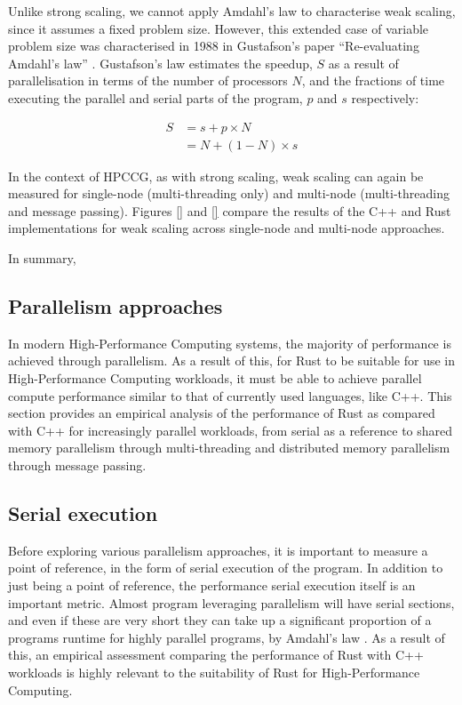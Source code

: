 Unlike strong scaling, we cannot apply Amdahl's law to characterise weak scaling, since it assumes a fixed problem size. However, this extended case of variable problem size was characterised in 1988 in Gustafson's paper ``Re-evaluating Amdahl's law'' \cite{gustafsonReevaluatingAmdahlLaw1988}. Gustafson's law estimates the speedup, $S$ as a result of parallelisation in terms of the number of processors $N$, and the fractions of time executing the parallel and serial parts of the program, $p$ and $s$ respectively:

\begin{align}
    S &= s + p \times N \\
      &= N + (1 - N) \times s
\end{align}

In the context of HPCCG, as with strong scaling, weak scaling can again be measured for single-node (multi-threading only) and multi-node (multi-threading and message passing). Figures \ref{} and \ref{} compare the results of the C++ and Rust implementations for weak scaling across single-node and multi-node approaches.


In summary,


\subsection{Parallelism approaches}
\label{ssec:parallelism-approaches}

In modern High-Performance Computing systems, the majority of performance is achieved through parallelism. As a result of this, for Rust to be suitable for use in High-Performance Computing workloads, it must be able to achieve parallel compute performance similar to that of currently used languages, like C++. This section provides an empirical analysis of the performance of Rust as compared with C++ for increasingly parallel workloads, from serial as a reference to shared memory parallelism through multi-threading and distributed memory parallelism through message passing.

\subsection{Serial execution}
\label{ssec:multi-threaded}

Before exploring various parallelism approaches, it is important to measure a point of reference, in the form of serial execution of the program. In addition to just being a point of reference, the performance serial execution itself is an important metric. Almost program leveraging parallelism will have serial sections, and even if these are very short they can take up a significant proportion of a programs runtime for highly parallel programs, by Amdahl's law \cite{amdahlsLaw}. As a result of this, an empirical assessment comparing the performance of Rust with C++ workloads is highly relevant to the suitability of Rust for High-Performance Computing.

